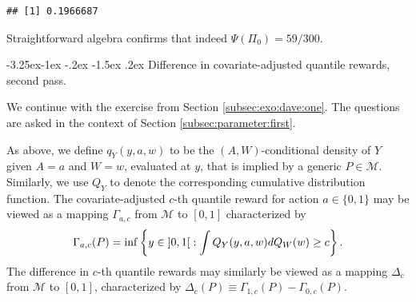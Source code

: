 \documentclass[]{article}
\makeatletter
\renewcommand\subsection{\@startsection{subsection}{3}{\z@}%
                                     {-3.25ex\@plus -1ex \@minus -.2ex}%
                                     {-1.5ex \@plus .2ex}%
                                     {\normalfont\normalsize\bfseries}}
\newcommand{\gear}{\usebox{\gearbox}\;}
\newcommand{\calM}{\mathcal{M}}
\theoremstyle{definition}
\theoremstyle{definition}
\theoremstyle{definition}
\theoremstyle{remark}
\makeatother
\begin{document}
\begin{verbatim}
## [1] 0.1966687
\end{verbatim}

Straightforward algebra confirms that indeed \(\Psi(\Pi_{0}) = 59/300\).

\subsection{\gear  Difference in  covariate-adjusted quantile  rewards, second
pass.}  
\label{subsec:exo:dave:two}

We continue with the exercise from Section \ref{subsec:exo:dave:one}.
The questions are asked in the context of Section
\ref{subsec:parameter:first}.

As above, we define \(q_{Y}(y,a,w)\) to be the \((A,W)\)-conditional
density of \(Y\) given \(A=a\) and \(W=w\), evaluated at \(y\), that is
implied by a generic \(P \in \calM\). Similarly, we use \(Q_{Y}\) to
denote the corresponding cumulative distribution function. The
covariate-adjusted \(c\)-th quantile reward for action \(a \in \{0,1\}\)
may be viewed as a mapping \(\Gamma_{a,c}\) from \(\calM\) to \([0,1]\)
characterized by \begin{equation*} \Gamma_{a,c}(P)  = \inf\left\{y
\in  \interval[open]{0}{1}  :  \int   Q_{Y}(y,a,w)  dQ_W(w)  \ge  c  \right\}.
\end{equation*} The difference in \(c\)-th quantile rewards may
similarly be viewed as a mapping \(\Delta_c\) from \(\calM\) to
\([0,1]\), characterized by
\(\Delta_c(P) \equiv \Gamma_{1,c}(P) - \Gamma_{0,c}(P)\).
\end{document}
